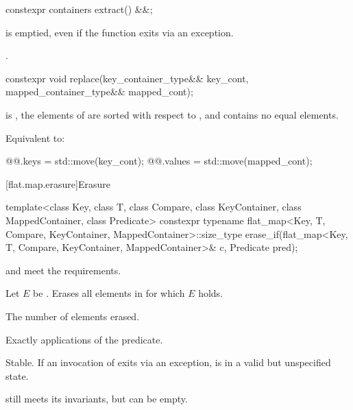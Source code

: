 %
\begin{itemdecl}
constexpr containers extract() &&;
\end{itemdecl}

\begin{itemdescr}
\pnum
\ensures
{} is emptied, even if the function exits via an exception.

\pnum
\returns
{}.
\end{itemdescr}

%
\begin{itemdecl}
constexpr void replace(key_container_type&& key_cont, mapped_container_type&& mapped_cont);
\end{itemdecl}

\begin{itemdescr}
\pnum
\expects
{} is ,
the elements of  are sorted with respect to , and
 contains no equal elements.

\pnum
\effects
Equivalent to:
\begin{codeblock}
@@.keys = std::move(key_cont);
@@.values = std::move(mapped_cont);
\end{codeblock}
\end{itemdescr}

[flat.map.erasure]{Erasure}

%
\begin{itemdecl}
template<class Key, class T, class Compare, class KeyContainer, class MappedContainer,
         class Predicate>
  constexpr typename flat_map<Key, T, Compare, KeyContainer, MappedContainer>::size_type
    erase_if(flat_map<Key, T, Compare, KeyContainer, MappedContainer>& c, Predicate pred);
\end{itemdecl}

\begin{itemdescr}
\pnum
\expects
{} and  meet the  requirements.

\pnum
\effects
Let $E$ be .
Erases all elements  in  for which $E$ holds.

\pnum
\returns
The number of elements erased.

\pnum
\complexity
Exactly  applications of the predicate.

\pnum
\remarks
Stable.
If an invocation of  exits via an exception,
 is in a valid but unspecified state.
\begin{note}
 still meets its invariants,
but can be empty.
\end{note}
\end{itemdescr}

